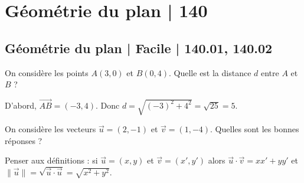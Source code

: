 



\section{Géométrie du plan | 140}


\subsection{Géométrie du plan | Facile | 140.01, 140.02}

\begin{question}
On considère les points $A(3,0)$ et $B(0,4)$. Quelle est la distance $d$ entre $A$ et $B$ ?
\begin{answers}  
\end{answers}
\begin{explanations}
D'abord, $\overrightarrow{AB}=(-3,4)$. Donc $d=\sqrt{(-3)^2+4^2}=\sqrt{25}=5$.
\end{explanations}
\end{question}

\begin{question}
On considère les vecteurs $\vec{u}=(2,-1)$ et $\vec{v}=(1,-4)$. Quelles sont les bonnes réponses ?
\begin{answers}  
\end{answers}
\begin{explanations}
Penser aux définitions : si $\vec{u}=(x,y)$ et $\vec{v}=(x',y')$ alors
$\vec{u}\cdot \vec{v} = xx'+yy'$ et $\|\vec{u}\| = \sqrt{\vec{u}\cdot \vec{u}}
= \sqrt{x^2+y^2}$.
\end{explanations}
\end{question}


